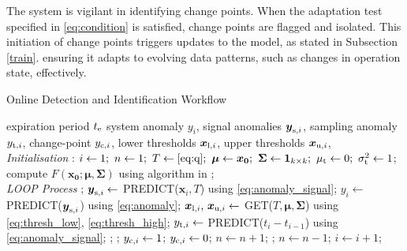 The system is vigilant in identifying change points. When the adaptation test specified in \eqref{eq:condition} is satisfied, change points are flagged and isolated. This initiation of change points triggers updates to the model, as stated in Subsection \ref{train}. ensuring it adapts to evolving data patterns, such as changes in operation state, effectively.

\begin{algorithm}[H]
  \caption{{Online Detection and Identification Workflow}} \label{alg:detector}
  \begin{algorithmic}[1]
    \renewcommand{\algorithmicrequire}{\textbf{Input:}}
    \renewcommand{\algorithmicensure}{\textbf{Output:}}
    \REQUIRE expiration period $t _{\text{e}}$
    \ENSURE system anomaly $y_i$, signal anomalies $\boldsymbol{y} _{\text{s}, i}$, sampling anomaly $y _{\text{t}, i}$, change-point $y _{\text{c}, i}$, lower thresholds $\boldsymbol{x} _{\text{l}, i}$, upper thresholds $\boldsymbol{x} _{\text{u}, i}$,
    \\ \textit{Initialisation} :
    \STATE $i \leftarrow 1;~ n \leftarrow 1;~ T \leftarrow \eqref{eq:q};~ \boldsymbol{\mu} \leftarrow \boldsymbol{x_0};~ \boldsymbol{\Sigma} \leftarrow \mathbf{1}_{k \times k};~ \mu _{\text{t}} \leftarrow 0;~ \sigma _{\text{t}}^2 \leftarrow 1$;
    \STATE compute $F(\boldsymbol{x_0}; \boldsymbol{\mu}, \boldsymbol{\Sigma})$ using algorithm in \cite{Genz2000};
    \\ \textit{LOOP Process}
    \LOOP
    ;
    \STATE $\boldsymbol{y} _{\text{s}, i} \leftarrow$ PREDICT($\boldsymbol{x}_i, T$) using \eqref{eq:anomaly_signal};
    \STATE $y_i \leftarrow$ PREDICT($\boldsymbol{y} _{\text{s}, i}$) using \eqref{eq:anomaly};
    \STATE $\boldsymbol{x} _{\text{l}, i}\text{, }\boldsymbol{x} _{\text{u}, i} \leftarrow$ GET($T, \boldsymbol{\mu}, \boldsymbol{\Sigma}$) using \eqref{eq:thresh_low}, \eqref{eq:thresh_high};
    \STATE $y _{\text{t}, i} \leftarrow$ PREDICT($t_i - t_{i-1}$) using \eqref{eq:anomaly_signal};
    ;
    \IF {\eqref{eq:anomaly} = 0 \OR \eqref{eq:condition}}
    ;
    \IF {\eqref{eq:condition}}
    \STATE $y _{\text{c}, i} \leftarrow 1$;
    \ELSE
    \STATE $y _{\text{c}, i} \leftarrow 0$;
    \ENDIF
    \STATE $n \leftarrow n + 1$;
    ;
    \STATE $n \leftarrow n - 1$;
    \ENDFOR
    \ENDIF
    \STATE $i \leftarrow i + 1$;
    \ENDLOOP
  \end{algorithmic}
\end{algorithm}
